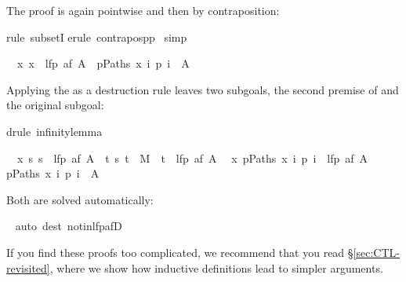 \begin{isabellebody}
\isadelimproof
%
\endisadelimproof
%
\isatagproof
%
\begin{isamarkuptxt}%
\noindent
The proof is again pointwise and then by contraposition:%
\end{isamarkuptxt}%
\isamarkuptrue%
\isamarkupfalse%
{\isacharparenleft}rule\ subsetI{\isacharparenright}\isanewline
{}\isamarkupfalse%
{\isacharparenleft}erule\ contrapos{\isacharunderscore}pp{\isacharparenright}\isanewline
{}\isamarkupfalse%
\ simp%
\begin{isamarkuptxt}%
\begin{isabelle}%
\ {}{\isachardot}\ {\isasymAnd}x{\isachardot}\ x\ {\isasymnotin}\ lfp\ {\isacharparenleft}af\ A{\isacharparenright}\ {\isasymLongrightarrow}\ {\isasymexists}p{\isasymin}Paths\ x{\isachardot}\ {\isasymforall}i{\isachardot}\ p\ i\ {\isasymnotin}\ A%
\end{isabelle}
Applying the  as a destruction rule leaves two subgoals, the second
premise of  and the original subgoal:%
\end{isamarkuptxt}%
\isamarkuptrue%
\isamarkupfalse%
{\isacharparenleft}drule\ infinity{\isacharunderscore}lemma{\isacharparenright}%
\begin{isamarkuptxt}%
\begin{isabelle}%
\ {}{\isachardot}\ {\isasymAnd}x{\isachardot}\ {\isasymforall}s{\isachardot}\ s\ {\isasymnotin}\ lfp\ {\isacharparenleft}af\ A{\isacharparenright}\ {\isasymlongrightarrow}\ {\isacharparenleft}{\isasymexists}t{\isachardot}\ {\isacharparenleft}s{\isacharcomma}\ t{\isacharparenright}\ {\isasymin}\ M\ {\isasymand}\ t\ {\isasymnotin}\ lfp\ {\isacharparenleft}af\ A{\isacharparenright}{\isacharparenright}\isanewline
\ {}{\isachardot}\ {\isasymAnd}x{\isachardot}\ {\isasymexists}p{\isasymin}Paths\ x{\isachardot}\ {\isasymforall}i{\isachardot}\ p\ i\ {\isasymnotin}\ lfp\ {\isacharparenleft}af\ A{\isacharparenright}\ {\isasymLongrightarrow}\isanewline
{}p{\isasymin}Paths\ x{\isachardot}\ {\isasymforall}i{\isachardot}\ p\ i\ {\isasymnotin}\ A%
\end{isabelle}
Both are solved automatically:%
\end{isamarkuptxt}%
\isamarkuptrue%
\ \isamarkupfalse%
{\isacharparenleft}auto\ dest{\isacharcolon}\ not{\isacharunderscore}in{\isacharunderscore}lfp{\isacharunderscore}afD{\isacharparenright}\isanewline
{}\isamarkupfalse%
%
\endisatagproof
{\isafoldproof}%
%
\isadelimproof
%
\endisadelimproof
%
\begin{isamarkuptext}%
If you find these proofs too complicated, we recommend that you read
\S\ref{sec:CTL-revisited}, where we show how inductive definitions lead to
simpler arguments.


\end{isamarkuptext}
\end{isabellebody}
